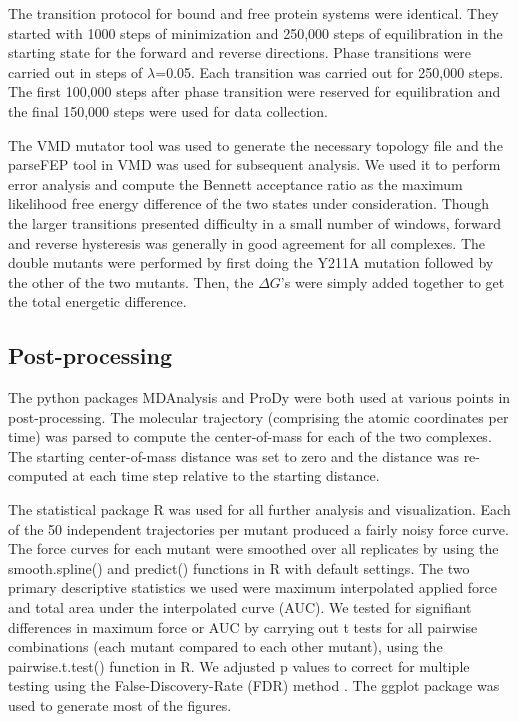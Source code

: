 \documentclass[12pt]{article}
\begin{document}
The transition protocol for bound and free protein systems were identical. They started with 1000 steps of minimization and 250,000 steps of equilibration in the starting state for the forward and reverse directions. Phase transitions were carried out in steps of $\lambda$=0.05. Each transition was carried out for 250,000 steps. The first 100,000 steps after phase transition were reserved for equilibration and the final 150,000 steps were used for data collection.

The VMD mutator tool was used to generate the necessary topology file and the parseFEP tool \citep{Liu2012} in VMD was used for subsequent analysis. We used it to perform error analysis and compute the Bennett acceptance ratio as the maximum likelihood free energy difference of the two states under consideration. Though the larger transitions presented difficulty in a small number of windows, forward and reverse hysteresis was generally in good agreement for all complexes. The double mutants were performed by first doing the Y211A mutation followed by the other of the two mutants. Then, the $\Delta G$'s were simply added together to get the total energetic difference.

\subsection{Post-processing}

The python packages MDAnalysis \citep{Agrawal2011} and ProDy \citep{Bakan2011} were both used at various points in post-processing. The molecular trajectory (comprising the atomic coordinates per time) was parsed to compute the center-of-mass for each of the two complexes. The starting center-of-mass distance was set to zero and the distance was re-computed at each time step relative to the starting distance. 

The statistical package R was used for all further analysis and visualization. Each of the 50 independent trajectories per mutant produced a fairly noisy force curve. The force curves for each mutant were smoothed over all replicates by using the smooth.spline() and predict() functions in R with default settings. The two primary descriptive statistics we used were maximum interpolated applied force and total area under the interpolated curve (AUC). We tested for signifiant differences in maximum force or AUC by carrying out t tests for all pairwise combinations (each mutant compared to each other mutant), using the pairwise.t.test() function in R. We adjusted p values to correct for multiple testing using the False-Discovery-Rate (FDR) method \citep{BenjaminiHochberg1995}. The ggplot \citep{ggplot} package was used to generate most of the figures. 
\end{document}
